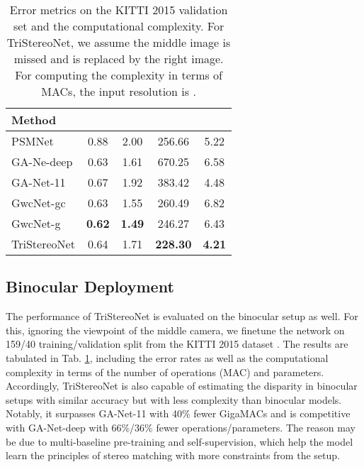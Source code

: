 \documentclass[10pt,twocolumn,letterpaper]{article}
\begin{document}
\begin{table}[tbp]
	\begin{center}
		\footnotesize
		\begin{tabular}{@{\hskip2pt}l@{\hskip1pt}|@{\hskip2pt}c@{\hskip2pt}c@{\hskip2pt}|@{\hskip2pt}c@{\hskip2pt}c@{\hskip2pt}}
			\hline				
			{Method} & \hspace{0.1cm}{EPE() } & \hspace{0.1cm}{D1(\%) } & \hspace{0.1cm}{MACs() } & \hspace{0.1cm}{Params() } \\				
			\hline				
			PSMNet\cite{chang2018pyramid} & 0.88 & 2.00  & 256.66 & 5.22 \\
			GA-Ne-deep\cite{zhang2019ga}  & 0.63 & 1.61  & 670.25 & 6.58 \\
			GA-Net-11\cite{zhang2019ga}   & 0.67 & 1.92  & 383.42 & 4.48 \\
			GwcNet-gc\cite{guo2019group}  & 0.63 & 1.55  & 260.49 & 6.82 \\
			GwcNet-g\cite{guo2019group}   & \textbf{0.62} & \textbf{1.49}  & 246.27 & 6.43 \\ \hdashline
			TriStereoNet                  & 0.64 & 1.71 & \textbf{228.30} & \textbf{4.21} \\
			\hline				
		\end{tabular}
	\end{center}
	\vspace*{-0.3cm}
	\caption{Error metrics on the KITTI 2015 validation set and the computational complexity. For TriStereoNet, we assume the middle image is missed and is replaced by the right image. For computing the complexity in terms of MACs, the input resolution is .}
	\label{tab:kitti2015}
\end{table} \subsection{Binocular Deployment}
The performance of TriStereoNet is evaluated on the binocular setup as well. For this, ignoring the viewpoint of the middle camera, we finetune the network on 159/40 training/validation split from the KITTI 2015 dataset \cite{menze2015object}. The results are tabulated in Tab. \ref{tab:kitti2015}, including the error rates as well as the computational complexity in terms of the number of operations (MAC) and parameters. Accordingly, TriStereoNet is also capable of estimating the disparity in binocular setups with similar accuracy but with less complexity than binocular models. Notably, it surpasses GA-Net-11 with 40\% fewer GigaMACs and is competitive with GA-Net-deep with 66\%/36\% fewer operations/parameters. The reason may be due to multi-baseline pre-training and self-supervision, which help the model learn the principles of stereo matching with more constraints from the setup.
\end{document}
